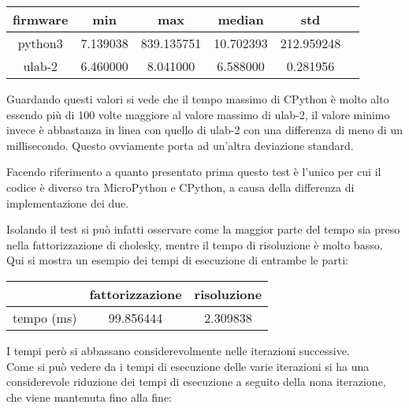 \documentclass[12pt,a4paper]{report}
\begin{document}
\begin{center}
\begin{tabular}{|c | c | c | c | c | c |}
\hline
firmware & min & max & median & std \\
\hline
python3 & 7.139038 & 839.135751 & 10.702393 &212.959248 \\
ulab-2 & 6.460000 & 8.041000 & 6.588000 & 0.281956 \\
\hline
\end{tabular}
\end{center}

Guardando questi valori si vede che il tempo massimo di CPython è molto
alto essendo più di 100 volte maggiore al valore massimo di ulab-2, il
valore minimo invece è abbastanza in linea con quello di ulab-2 con una
differenza di meno di un millisecondo. Questo ovviamente porta ad
un'altra deviazione standard.

Facendo riferimento a quanto presentato prima questo test è
l'unico per cui il codice è diverso tra MicroPython e
CPython, a causa della differenza di implementazione dei due.

Isolando il test si può infatti osservare come la maggior parte del
tempo sia preso nella fattorizzazione di cholesky, mentre il tempo di
risoluzione è molto basso.\\
Qui si mostra un esempio dei tempi di esecuzione di entrambe le parti:

\begin{center}
\begin{tabular}{|c | c | c |}
\hline
 &fattorizzazione & risoluzione \\
\hline
tempo (ms) & 99.856444 & 2.309838 \\
\hline
\end{tabular}
\end{center}

I tempi però si abbassano considerevolmente nelle iterazioni
successive.\\
Come si può vedere da i tempi di esecuzione delle varie iterazioni si ha
una considerevole riduzione dei tempi di esecuzione a seguito della nona
iterazione, che viene mantenuta fino alla fine:
\end{document}
